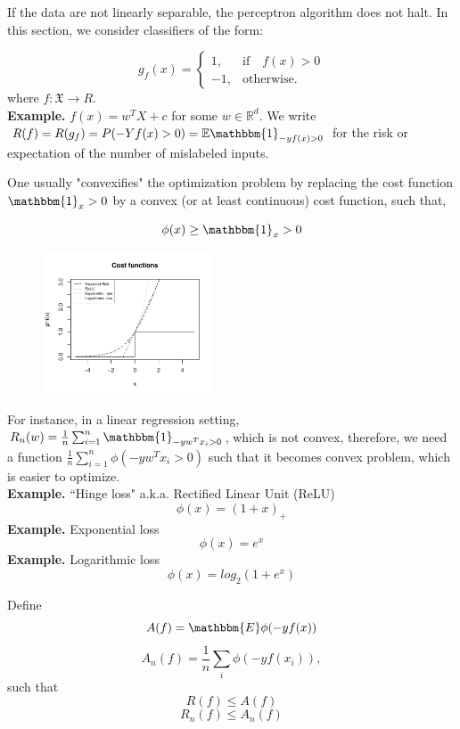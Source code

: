 \documentclass[11pt, english]{article}
\begin{document}
If the data are not linearly separable, the perceptron algorithm does not halt. In this section, we consider classifiers of the form:
 
\begin{equation*}
	g_f(x)=\begin{cases}
	1, & \text{if} \quad f(x) > 0\\
	-1, & \text{otherwise}.
	\end{cases}
\end{equation*}
where $f:\mathfrak{X} \rightarrow R$.\\
\textbf{Example.} $f(x) = w^TX+c$ for some $w \in \mathbb{R}^d$.
We write $R(f) = R(g_f) = P(-Yf(x)>0) = \mathbb{E}\mathbbm{1}_{-yf(x)>0}$ for the risk or expectation of the number of mislabeled inputs.
 
One usually "convexifies" the optimization problem by replacing the cost function $\mathbbm{1}_x>0$ by a convex (or at least continuous) cost function, such that,
 
$$\phi(x) \geq \mathbbm{1}_x>0$$
 
 
\begin{figure}
 	\centering
 	\includegraphics[width=0.45\textwidth]{cost_functions.pdf}
\end{figure}
 
For instance, in a linear regression setting, $R_n(w) = \frac{1}{n} \sum_{i=1}^{n} \mathbbm{1}_{-yw^Tx_i>0}$, which is not convex, therefore, we need a function $\frac{1}{n} \sum_{i=1}^{n} \phi(-yw^Tx_i>0)$ such that it becomes convex problem, which is easier to optimize.\\
 
\textbf{Example.} ``Hinge loss" a.k.a. Rectified Linear Unit (ReLU)\\
$$\phi(x) = (1+x)_+$$
\textbf{Example.} Exponential loss\\
$$\phi(x) = e^x$$
\textbf{Example.} Logarithmic loss\\
$$\phi(x) = log_2(1+e^x)$$
 
Define $$A(f) = \mathbbm{E}\phi(-yf(x))$$ $$A_n(f) = \frac{1}{n}\sum_i \phi(-yf(x_i)),$$ such that 
$$R(f) \leq A(f)$$
$$R_n(f) \leq A_n(f)$$
 
\end{document}
